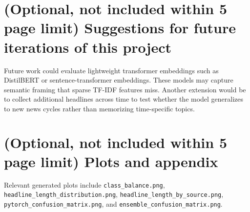\documentclass[10pt]{article}
\begin{document}
\section{(Optional, not included within 5 page limit) Suggestions for future iterations of this project}
Future work could evaluate lightweight transformer embeddings such as DistilBERT or sentence-transformer embeddings. These models may capture semantic framing that sparse TF-IDF features miss. Another extension would be to collect additional headlines across time to test whether the model generalizes to new news cycles rather than memorizing time-specific topics.

\section{(Optional, not included within 5 page limit) Plots and appendix}
Relevant generated plots include \texttt{class\_balance.png}, \texttt{headline\_length\_distribution.png}, \texttt{headline\_length\_by\_source.png}, \texttt{pytorch\_confusion\_matrix.png}, and \texttt{ensemble\_confusion\_matrix.png}.
\end{document}
